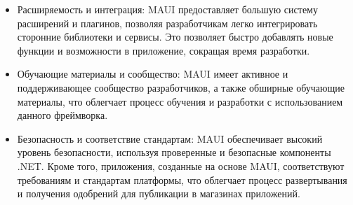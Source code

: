 \begin{itemize}
\item Расширяемость и интеграция: MAUI предоставляет большую систему расширений и плагинов, позволяя разработчикам легко интегрировать сторонние библиотеки и сервисы. Это позволяет быстро добавлять новые функции и возможности в приложение, сокращая время разработки.

\item Обучающие материалы и сообщество: MAUI имеет активное и поддерживающее сообщество разработчиков, а также обширные обучающие материалы, что облегчает процесс обучения и разработки с использованием данного фреймворка.

\item Безопасность и соответствие стандартам: MAUI обеспечивает высокий уровень безопасности, используя проверенные и безопасные компоненты .NET. Кроме того, приложения, созданные на основе MAUI, соответствуют требованиям и стандартам платформы, что облегчает процесс развертывания и получения одобрений для публикации в магазинах приложений.
\end{itemize}